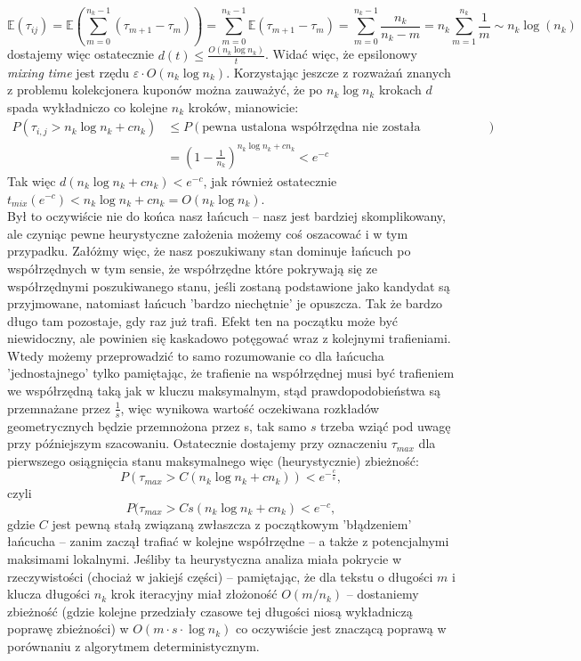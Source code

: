 \documentclass[a4paper]{article}
\theoremstyle{defn}
\theoremstyle{theorem}
\theoremstyle{lemma}
\theoremstyle{cor}
\theoremstyle{fact}
\begin{document}
$$\mathbb{E}(\tau_{ij}) = \mathbb{E}(\sum\limits_{m=0}^{n_k - 1} (\tau_{m+1} - \tau_m)) = \sum\limits_{m=0}^{n_k - 1} \mathbb{E}(\tau_{m+1} - \tau_m) = \sum\limits_{m=0}^{n_k - 1} \frac{n_k}{n_k - m} = n_k \sum\limits_{m=1}^{n_k} \frac{1}{m} \sim n_k \log(n_k)$$
dostajemy więc ostatecznie $d(t) \leq \frac{O(n_k \log n_k)}{t}$. Widać więc, że epsilonowy \textit{mixing time} jest rzędu $\varepsilon \cdot O(n_k \log n_k)$. Korzystając jeszcze z rozważań znanych z problemu kolekcjonera kuponów można zauważyć, że po $n_k \log n_k$ krokach $d$ spada wykładniczo co kolejne $n_k$ kroków, mianowicie:
\begin{align*}
    P(\tau_{i,j} > n_k \log n_k + cn_k) &\leq P(\text{pewna ustalona współrzędna nie została odwiedzona})\\
    &= (1-\frac{1}{n_k})^{n_k \log n_k + cn_k} < e^{-c}
\end{align*}
Tak więc $d(n_k \log n_k + cn_k) < e^{-c}$, jak również ostatecznie $t_{mix}(e^{-c}) < n_k \log n_k + cn_k = O(n_k \log n_k)$. \\
Był to oczywiście nie do końca nasz łańcuch – nasz jest bardziej skomplikowany, ale czyniąc pewne heurystyczne założenia możemy coś oszacować i w tym przypadku. Załóżmy więc, że nasz poszukiwany stan dominuje łańcuch po współrzędnych w tym sensie, że współrzędne które pokrywają się ze współrzędnymi poszukiwanego stanu, jeśli zostaną podstawione jako kandydat są przyjmowane, natomiast łańcuch 'bardzo niechętnie' je opuszcza. Tak że bardzo długo tam pozostaje, gdy raz już trafi. Efekt ten na początku może być niewidoczny, ale powinien się kaskadowo potęgować wraz z kolejnymi trafieniami. Wtedy możemy przeprowadzić to samo rozumowanie co dla łańcucha 'jednostajnego' tylko pamiętając, że trafienie na współrzędnej musi być trafieniem we współrzędną taką jak w kluczu maksymalnym, stąd prawdopodobieństwa są przemnażane przez $\frac{1}{s}$, więc wynikowa wartość oczekiwana rozkładów geometrycznych będzie przemnożona przez s, tak samo $s$ trzeba wziąć pod uwagę przy późniejszym szacowaniu. Ostatecznie dostajemy przy oznaczeniu $\tau_{max}$ dla pierwszego osiągnięcia stanu maksymalnego więc (heurystycznie) zbieżność:
$$P(\tau_{max} > C(n_k \log n_k + cn_k)) < e^{-\frac{c}{s}},$$
czyli
$$P(\tau_{max} > Cs(n_k \log n_k + cn_k) < e^{-c},$$
gdzie $C$ jest pewną stałą związaną zwłaszcza z początkowym 'błądzeniem' łańcucha – zanim zaczął trafiać w kolejne współrzędne – a także z potencjalnymi maksimami lokalnymi. Jeśliby ta heurystyczna analiza miała pokrycie w rzeczywistości (chociaż w jakiejś części) – pamiętając, że dla tekstu o długości $m$ i klucza długości $n_k$ krok iteracyjny miał złożoność $O(m/n_k)$ – dostaniemy zbieżność (gdzie kolejne przedziały czasowe tej długości niosą wykładniczą poprawę zbieżności) w $O(m \cdot s \cdot \log n_k)$ co oczywiście jest znaczącą poprawą w porównaniu z algorytmem deterministycznym.
\\
\end{document}
